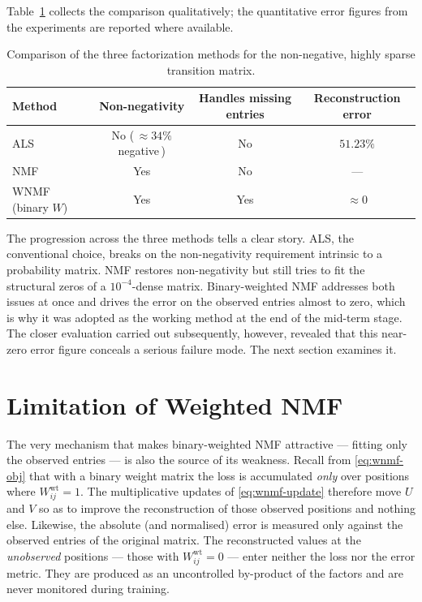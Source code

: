 Table~\ref{tab:mf-comparison} collects the comparison qualitatively; the
quantitative error figures from the experiments are reported where available.

\begin{table}[ht]
  \centering
  \caption{Comparison of the three factorization methods for the non-negative,
           highly sparse transition matrix.}
  \label{tab:mf-comparison}
  \begin{tabular}{lccc}
    \toprule
    Method & Non-negativity & Handles missing entries & Reconstruction error \\
    \midrule
    ALS              & No (\,$\approx34\%$ negative\,) & No   & $51.23\%$ \\
    NMF              & Yes                              & No   & --- \\
    WNMF (binary $W$) & Yes                             & Yes  & $\approx 0$ \\
    \bottomrule
  \end{tabular}
\end{table}

\noindent The progression across the three methods tells a clear story. ALS,
the conventional choice, breaks on the non-negativity requirement intrinsic to
a probability matrix. NMF restores non-negativity but still tries to fit the
structural zeros of a $10^{-4}$-dense matrix. Binary-weighted NMF addresses
both issues at once and drives the error on the observed entries almost to
zero, which is why it was adopted as the working method at the end of the
mid-term stage. The closer evaluation carried out subsequently, however,
revealed that this near-zero error figure conceals a serious failure mode. The
next section examines it.

\section{Limitation of Weighted NMF}
\label{sec:wnmf-limit}

The very mechanism that makes binary-weighted NMF attractive --- fitting only
the observed entries --- is also the source of its weakness. Recall from
\eqref{eq:wnmf-obj} that with a binary weight matrix the loss is accumulated
\emph{only} over positions where $W^{\mathrm{wt}}_{ij}=1$. The multiplicative
updates of \eqref{eq:wnmf-update} therefore move $U$ and $V$ so as to improve
the reconstruction of those observed positions and nothing else. Likewise, the
absolute (and normalised) error is measured only against the observed entries
of the original matrix. The reconstructed values at the \emph{unobserved}
positions --- those with $W^{\mathrm{wt}}_{ij}=0$ --- enter neither the loss nor
the error metric. They are produced as an uncontrolled by-product of the
factors and are never monitored during training.

